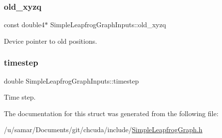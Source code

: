 \subsubsection{\texorpdfstring{old\+\_\+xyzq}{old\_xyzq}}
{\footnotesize\ttfamily const double4$\ast$ Simple\+Leapfrog\+Graph\+Inputs\+::old\+\_\+xyzq}



Device pointer to old positions. 

\hypertarget{structSimpleLeapfrogGraphInputs_a197aa8d9f5695cda2406de1aff9b4e3b}{}\label{structSimpleLeapfrogGraphInputs_a197aa8d9f5695cda2406de1aff9b4e3b} 
\subsubsection{\texorpdfstring{timestep}{timestep}}
{\footnotesize\ttfamily double Simple\+Leapfrog\+Graph\+Inputs\+::timestep}



Time step. 



The documentation for this struct was generated from the following file\+:\begin{DoxyCompactItemize}
\item 
/u/samar/\+Documents/git/chcuda/include/\hyperlink{SimpleLeapfrogGraph_8h}{Simple\+Leapfrog\+Graph.\+h}\end{DoxyCompactItemize}
